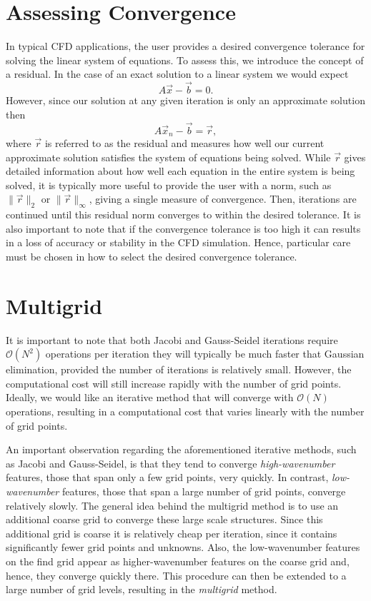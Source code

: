 \section{Assessing Convergence}
In typical CFD applications, the user provides a desired convergence tolerance for solving the linear system of equations. To assess this, we introduce the concept of a residual. In the case of an exact solution to a linear system we would expect
\begin{equation}
	A \vec{x} - \vec{b} = 0.
\end{equation}
However, since our solution at any given iteration is only an approximate solution then
\begin{equation}
	A \vec{x}_n - \vec{b} = \vec{r},
\end{equation}
where $\vec{r}$ is referred to as the residual and measures how well our current approximate solution satisfies the system of equations being solved. While $\vec{r}$ gives detailed information about how well each equation in the entire system is being solved, it is typically more useful to provide the user with a norm, such as $\| \vec{r} \|_2$ or $\| \vec{r} \|_\infty$, giving a single measure of convergence. Then, iterations are continued until this residual norm converges to within the desired tolerance. It is also important to note that if the convergence tolerance is too high it can results in a loss of accuracy or stability in the CFD simulation. Hence, particular care must be chosen in how to select the desired convergence tolerance.

\section{Multigrid}
It is important to note that both Jacobi and Gauss-Seidel iterations require $\mathcal{O}(N^2)$ operations per iteration they will typically be much faster that Gaussian elimination, provided the number of iterations is relatively small. However, the computational cost will still increase rapidly with the number of grid points. Ideally, we would like an iterative method that will converge with $\mathcal{O}(N)$ operations, resulting in a computational cost that varies linearly with the number of grid points.

An important observation regarding the aforementioned iterative methods, such as Jacobi and Gauss-Seidel, is that they tend to converge {\it high-wavenumber} features, those that span only a few grid points, very quickly. In contrast, {\it low-wavenumber} features, those that span a large number of grid points, converge relatively slowly. The general idea behind the multigrid method is to use an additional coarse grid to converge these large scale structures. Since this additional grid is coarse it is relatively cheap per iteration, since it contains significantly fewer grid points and unknowns. Also, the low-wavenumber features on the find grid appear as higher-wavenumber features on the coarse grid and, hence, they converge quickly there. This procedure can then be extended to a large number of grid levels, resulting in the {\it multigrid} method.

